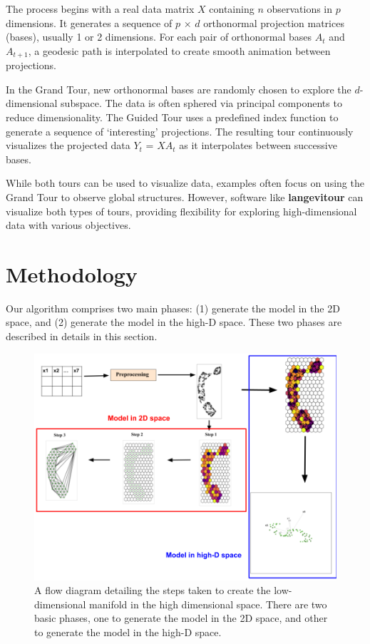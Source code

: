 \documentclass[
  12pt]{article}
\begin{document}
The process begins with a real data matrix \(X\) containing \(n\)
observations in \(p\) dimensions. It generates a sequence of \(p\) ×
\(d\) orthonormal projection matrices (bases), usually 1 or 2
dimensions. For each pair of orthonormal bases \(A_t\) and \(A_{t+1}\),
a geodesic path is interpolated to create smooth animation between
projections.

In the Grand Tour, new orthonormal bases are randomly chosen to explore
the \(d\)-dimensional subspace. The data is often sphered via principal
components to reduce dimensionality. The Guided Tour uses a predefined
index function to generate a sequence of `interesting' projections. The
resulting tour continuously visualizes the projected data \(Y_t\) =
\(XA_t\) as it interpolates between successive bases.

While both tours can be used to visualize data, examples often focus on
using the Grand Tour to observe global structures. However, software
like \textbf{langevitour} can visualize both types of tours, providing
flexibility for exploring high-dimensional data with various objectives.

\hypertarget{sec-methods}{%
\section{Methodology}\label{sec-methods}}

Our algorithm comprises two main phases: (1) generate the model in the
2D space, and (2) generate the model in the high-D space. These two
phases are described in details in this section.

\begin{figure}

{\centering \includegraphics[width=1\textwidth,height=1\textheight]{figures/workflow.png}

}

\caption{\label{fig-meth}A flow diagram detailing the steps taken to
create the low-dimensional manifold in the high dimensional space. There
are two basic phases, one to generate the model in the 2D space, and
other to generate the model in the high-D space.}

\end{figure}
\end{document}
